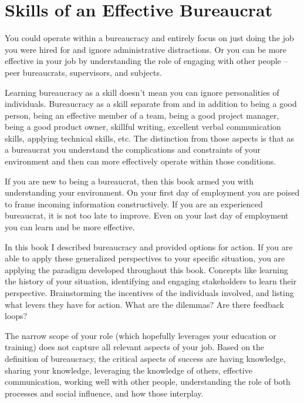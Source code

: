 \chapter{Skills of an Effective Bureaucrat\label{sec:last-chapter}}

You could operate within a bureaucracy and entirely focus on just doing the job you were hired for and ignore administrative distractions. Or you can be more effective in your job by understanding the role of engaging with other people -- peer bureaucrats, supervisors, and subjects. 

Learning bureaucracy as a skill doesn't mean you can ignore personalities of individuals. Bureaucracy as a skill separate from and in addition to being a good person, being an effective member of a team, being a good project manager, being a good product owner, skillful writing, excellent verbal communication skills, applying technical skills, etc. The distinction from those aspects is that as a bureaucrat you understand the complications and constraints of your environment and then can more effectively operate within those conditions.

If you are new to being a bureaucrat, then this book armed you with understanding your environment. On your first day of employment you are poised to frame incoming information constructively.
If you are an experienced bureaucrat, it is not too late to improve. Even on your last day of employment you can learn and be more effective.

In this book I described bureaucracy and provided options for action. If you are able to apply these generalized perspectives to your specific situation, you are applying the paradigm developed throughout this book. Concepts like learning the history of your situation, identifying and engaging stakeholders to learn their perspective. Brainstorming the incentives of the individuals involved, and listing what levers they have for action. What are the dilemmas? Are there feedback loops?



The narrow scope of your role (which hopefully leverages your education or training) does not capture all relevant aspects of your job. 
Based on the definition of \gls{bureaucracy}, the critical aspects of success are having knowledge, sharing your knowledge, leveraging the knowledge of others, effective communication, working well with other people, understanding the role of both processes and social influence, and how those interplay. 

